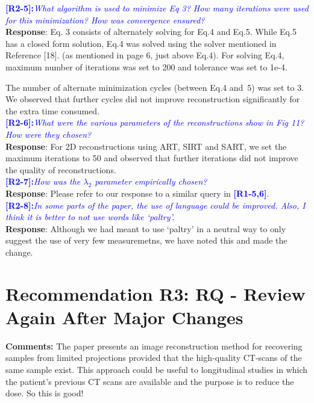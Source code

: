 \documentclass{article}
\begin{document}
\textcolor{blue}{\textbf{[R2-5]:}\textit{What algorithm is used to minimize Eq 3? How many iterations were used for this minimization? How was convergence ensured?}}\\

\textbf{Response}: Eq. 3 consists of alternately solving for Eq.4 and Eq.5. While Eq.5 has a closed form solution, Eq.4 was solved using the solver mentioned in Reference [18]. (as mentioned in page 6, just above Eq.4). 
For solving Eq.4, maximum number of iterations was set to 200 and tolerance was set to 1e-4.

The number of alternate minimization cycles (between Eq.4 and~5) was set to 3. We observed that further cycles did not improve reconstruction significantly for the extra time consumed.
\\

\textcolor{blue}{\textbf{[R2-6]:}\textit{What were the various parameters of the reconstructions show in Fig 11? How were they chosen?
}}\\

\textbf{Response}: For 2D reconstructions using ART, SIRT and SART, we set the maximum iterations to 50 and observed that further iterations did not improve the quality of reconstructions.\\

\textcolor{blue}{\textbf{[R2-7]:}\textit{How was the $\lambda_2$ parameter empirically chosen?
}}\\

\textbf{Response}: Please refer to our response to a similar query in \textcolor{blue}{\textbf{[R1-5,6]}}.\\

\textcolor{blue}{\textbf{[R2-8]:}\textit{In some parts of the paper, the use of language could be improved. Also, I think it is better to not use words like `paltry'.}}\\

\textbf{Response}: Although we had meant to use `paltry' in a neutral way to only suggest the use of very few measuremetns, we  have noted this and made the change.\\

\section{Recommendation R3: RQ - Review Again After Major Changes}

\textbf{Comments:} The paper presents an image reconstruction method for recovering samples from limited projections provided that the high-quality CT-scans of the same sample exist. This approach could be useful to longitudinal studies in which the patient's previous CT scans are available and the purpose is to reduce the dose. So this is good!\\
\end{document}
